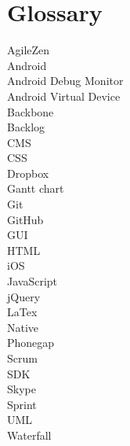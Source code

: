 \chapter{Glossary}


\begin{description}
   \item[AgileZen]
   \item[Android]
   \item[Android Debug Monitor]
   \item[Android Virtual Device]
   \item[Backbone]
   \item[Backlog]
   \item[CMS]
   \item[CSS]
   \item[Dropbox]
   \item[Gantt chart]
   \item[Git]
   \item[GitHub]
   \item[GUI]
   \item[HTML]
   \item[iOS]
   \item[JavaScript]
   \item[jQuery]
   \item[LaTex]
   \item[Native]
   \item[Phonegap]
   \item[Scrum]
   \item[SDK]
   \item[Skype]
   \item[Sprint]
   \item[UML] 
   \item[Waterfall]  
\end{description}